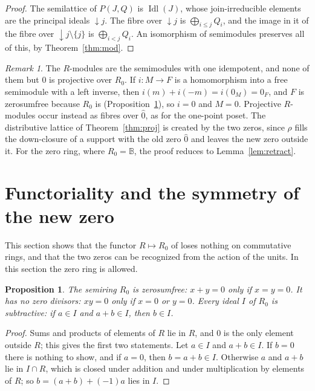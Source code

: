 \documentclass[11pt]{amsart}
\newtheorem{proposition}[thm]{Proposition}
\theoremstyle{remark}
\newtheorem{remark}[thm]{Remark}
\newcommand{\B}{\mathbb B}
\newcommand{\oz}{\widehat{0}}
\DeclareMathOperator{\Idl}{Idl}
\begin{document}
\begin{proof}
The semilattice of $P(J,Q)$ is $\Idl(J)$, whose join-irreducible elements are the principal ideals ${\downarrow}j$. The fibre over ${\downarrow}j$ is $\bigoplus_{i\le j}Q_i$, and the image in it of the fibre over ${\downarrow}j\setminus\{j\}$ is $\bigoplus_{i<j}Q_i$. An isomorphism of semimodules preserves all of this, by Theorem~\ref{thm:mod}.
\end{proof}

\begin{remark}\label{rem:one-idempotent}
The $R$-modules are the semimodules with one idempotent, and none of them but $0$ is projective over $R_0$. If $i\colon M\to F$ is a homomorphism into a free semimodule with a left inverse, then $i(m)+i(-m)=i(0_M)=0_F$, and $F$ is zerosumfree because $R_0$ is (Proposition~\ref{prop:golan}), so $i=0$ and $M=0$. Projective $R$-modules occur instead as fibres over $\oz$, as for the one-point poset. The distributive lattice of Theorem~\ref{thm:proj} is created by the two zeros, since $\rho$ fills the down-closure of a support with the old zero $\oz$ and leaves the new zero outside it. For the zero ring, where $R_0=\B$, the proof reduces to Lemma~\ref{lem:retract}.
\end{remark}

\section{Functoriality and the symmetry of the new zero}\label{sec:sym}

This section shows that the functor $R\mapsto R_0$ of \cite{FGJM} loses nothing on commutative rings, and that the two zeros can be recognized from the action of the units. In this section the zero ring is allowed.

\begin{proposition}\label{prop:golan}
The semiring $R_0$ is zerosumfree: $x+y=0$ only if $x=y=0$. It has no zero divisors: $xy=0$ only if $x=0$ or $y=0$. Every ideal $I$ of $R_0$ is subtractive: if $a\in I$ and $a+b\in I$, then $b\in I$.
\end{proposition}

\begin{proof}
Sums and products of elements of $R$ lie in $R$, and $0$ is the only element outside $R$; this gives the first two statements. Let $a\in I$ and $a+b\in I$. If $b=0$ there is nothing to show, and if $a=0$, then $b=a+b\in I$. Otherwise $a$ and $a+b$ lie in $I\cap R$, which is closed under addition and under multiplication by elements of $R$; so $b=(a+b)+(-1)a$ lies in $I$.
\end{proof}
\end{document}
